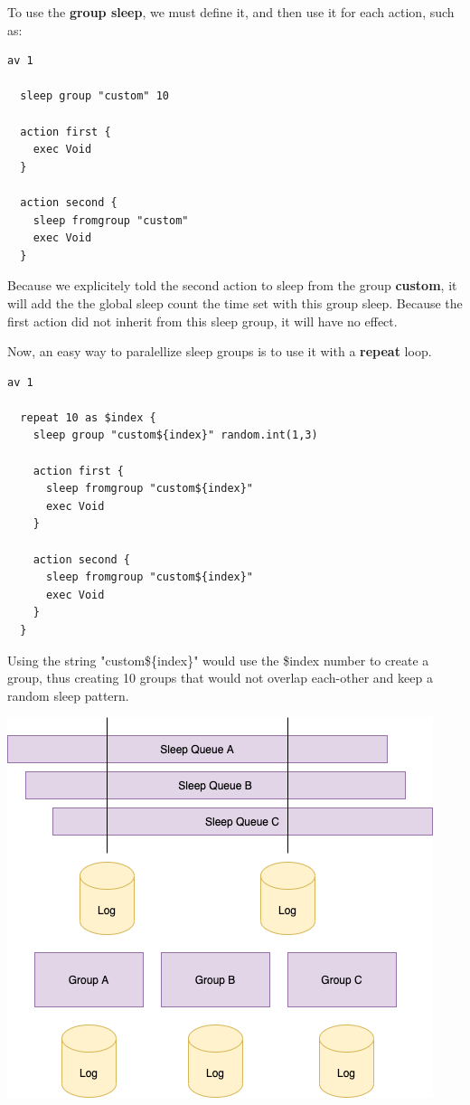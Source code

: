 \documentclass[10pt]{article}
\begin{document}
To use the \textbf{group sleep}, we must define it, and then use it for each action, such as:
\begin{lstlisting}[caption={Group sleep},captionpos=b]
  av 1

  sleep group "custom" 10

  action first {
    exec Void
  }

  action second {
    sleep fromgroup "custom"
    exec Void
  }
\end{lstlisting}

Because we explicitely told the second action to sleep from the group \textbf{custom}, it will add the the global sleep count the time set with this group sleep. Because the first action did not inherit from this sleep group, it will have no effect.

Now, an easy way to paralellize sleep groups is to use it with a \textbf{repeat} loop.
\begin{lstlisting}[caption={Group sleep in a loop},captionpos=b]
  av 1
  
  repeat 10 as $index {
    sleep group "custom${index}" random.int(1,3)
    
    action first {
      sleep fromgroup "custom${index}"
      exec Void
    }

    action second {
      sleep fromgroup "custom${index}"
      exec Void
    }
  }
\end{lstlisting}

Using the string "custom\$\{index\}" would use the \$index number to create a group, thus creating 10 groups that would not overlap each-other and keep a random sleep pattern.

\begin{center}
\includegraphics[width=\textwidth]{groupsleep.png}
\end{center}
\end{document}
